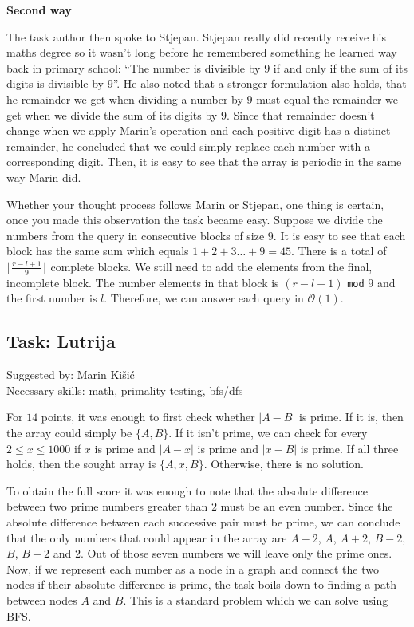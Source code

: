 \documentclass[a4paper]{article}
\begin{document}
\textbf{Second way}

The task author then spoke to Stjepan. Stjepan really did recently receive his
maths degree so it wasn't long before he remembered something he learned way
back in primary school: ``The number is divisible by $9$ if and only if the
sum of its digits is divisible by $9$''. He also noted that a stronger
formulation also holds, that he remainder we get when dividing a number by $9$
must equal the remainder we get when we divide the sum of its digits by $9$.
Since that remainder doesn't change when we apply Marin's operation and each
positive digit has a distinct remainder, he concluded that we could simply
replace each number with a corresponding digit. Then, it is easy to see that
the array is periodic in the same way Marin did.

Whether your thought process follows Marin or Stjepan, one thing is certain,
once you made this observation the task became easy. Suppose we divide the
numbers from the query in consecutive blocks of size $9$. It is easy to see that
each block has the same sum which equals $1 + 2 + 3 \dots + 9 = 45$. There is
a total of $\lfloor \frac{r - l + 1}{9} \rfloor$ complete blocks. We still need
to add the elements from the final, incomplete block. The number elements
in that block is $(r - l + 1)$ \texttt{mod} $9$ and the first number is $l$.
Therefore, we can answer each query in $\mathcal{O}(1)$.

\clearpage

\subsection*{Task: Lutrija}
\textsf{Suggested by: Marin Kišić}\\
\textsf{Necessary skills: math, primality testing, bfs/dfs}

For $14$ points, it was enough to first check whether $|A-B|$ is prime. If it
is, then the array could simply be $\{A, B\}$. If it isn't prime, we can check
for every $2 \le x \le 1000$ if $x$ is prime and $|A - x|$ is prime and $|x - B|$
is prime. If all three holds, then the sought array is $\{A, x, B\}$. Otherwise,
there is no solution.

To obtain the full score it was enough to note that the absolute difference
between two prime numbers greater than $2$ must be an even number. Since the
absolute difference between each successive pair must be prime, we can conclude
that the only numbers that could appear in the array are $A-2$, $A$, $A+2$, $B-2$,
$B$, $B+2$ and $2$. Out of those seven numbers we will leave only the prime ones.
Now, if we represent each number as a node in a graph and connect the two nodes
if their absolute difference is prime, the task boils down to finding a path
between nodes $A$ and $B$. This is a standard problem which we can solve using
BFS.
\end{document}
